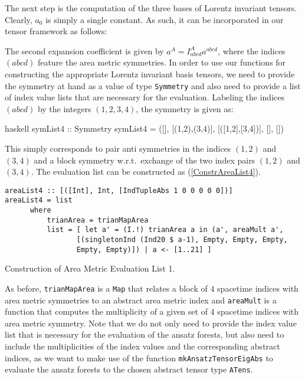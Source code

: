 The next step is the computation of the three bases of Lorentz invariant tensors. Clearly, $a_0$ is simply a single constant. As such, it can be incorporated in our tensor framework as follows:
\begin{center}
\end{center}
The second expansion coefficient is given by $a^A = I^A_{abcd} a^{abcd}$, where the indices $(abcd)$ feature the area metric symmetries. In order to use our functions for constructing the appropriate Lorentz invariant basis tensors, we need to provide the symmetry at hand as a value of type \texttt{Symmetry} and also need to provide a list of index value lists that are necessary for the evaluation. Labeling the indices $(abcd)$ by the integers $(1,2,3,4)$, the symmetry is given as:
\begin{center}
\begin{cminted}{haskell}
symList4 :: Symmetry
symList4 = ([], [(1,2),(3,4)], [([1,2],[3,4])], [], [])
\end{cminted}
\end{center}
This simply corresponds to pair anti symmetries in the indices $(1,2)$ and $(3,4)$ and a block symmetry w.r.t.\ exchange of the two index pairs $(1,2)$ and $(3,4)$. The evaluation list can be constructed as (\ref{ConstrAreaList4}).
\begin{listing}[hbt!]
\begin{verbatim}
areaList4 :: [([Int], Int, [IndTupleAbs 1 0 0 0 0 0])]
areaList4 = list
      where
          trianArea = trianMapArea
          list = [ let a' = (I.!) trianArea a in (a', areaMult a',
                 [(singletonInd (Ind20 $ a-1), Empty, Empty, Empty,
                 Empty, Empty)]) | a <- [1..21] ]
\end{verbatim} 
\caption{Construction of Area Metric Evaluation List 1.}\label{ConstrAreaList4}
\end{listing}
As before, \texttt{trianMapArea} is a \texttt{Map} that relates a block of $4$ spacetime indices with area metric symmetries to an abstract area metric index and \texttt{areaMult} is a function that computes the multiplicity of a given set of 4 spacetime indices with area metric symmetry. Note that we do not only need to provide the index value list that is necessary for the evaluation of the ansatz forests, but also need to include the multiplicities of the index values and the corresponding abstract indices, as we want to make use of the function \texttt{mkAnsatzTensorEigAbs} to evaluate the ansatz forests to the chosen abstract tensor type \texttt{ATens}. 


